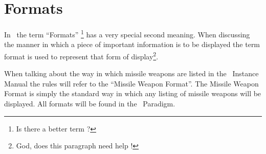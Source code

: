 \section{Formats}

In \SH\ the term ``Formats'' \footnote{Is there a better term ? }
has a very special second meaning. When discussing the manner in 
which a piece of important information is to be displayed the term 
format is used to represent that form of display\footnote{God, does 
this paragraph need help !}. 

When talking about the way in which missile weapons are listed in the 
\SH\ Instance Manual the rules will refer to the 
``Missile Weapon Format''. The Missile Weapon Format is simply the 
standard way in which any listing of missile weapons will be displayed.
All formats will be found in the \SH\ Paradigm.


